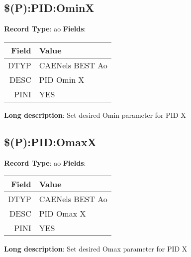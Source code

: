 \subsection{\$(P):PID:OminX}
\textbf{Record Type}: ao \newline \newline 
\textbf{Fields}: \newline 
\begin{tabularx}{0.7\linewidth}{|r|X|}
\hline Field & Value \\
\hline
\hline
DTYP & CAENels BEST Ao\\
\hline
DESC & PID Omin X\\
\hline
PINI & YES\\
\hline
\end{tabularx}
\newline \newline \newline
\textbf{Long description}: \newline 
 Set desired Omin parameter for PID X
\newline \newline

\subsection{\$(P):PID:OmaxX}
\textbf{Record Type}: ao \newline \newline 
\textbf{Fields}: \newline 
\begin{tabularx}{0.7\linewidth}{|r|X|}
\hline Field & Value \\
\hline
\hline
DTYP & CAENels BEST Ao\\
\hline
DESC & PID Omax X\\
\hline
PINI & YES\\
\hline
\end{tabularx}
\newline \newline \newline
\textbf{Long description}: \newline 
 Set desired Omax parameter for PID X
\newline \newline

